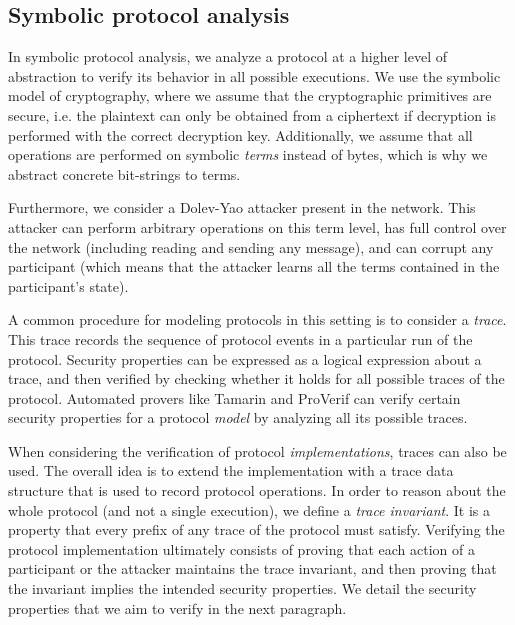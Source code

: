 
\subsection{Symbolic protocol analysis}
\label{sec:symbolic-protocol-analysis}

In symbolic protocol analysis, we analyze a protocol at a higher level of abstraction to verify its behavior in all possible executions.
We use the symbolic model of cryptography, where we assume that the cryptographic primitives are secure, i.e. the plaintext can only be obtained from a ciphertext if decryption is performed with the correct decryption key.
Additionally, we assume that all operations are performed on symbolic \emph{terms} instead of bytes, which is why we abstract concrete bit-strings to terms.

Furthermore, we consider a Dolev-Yao\cite{} attacker present in the network. This attacker can perform arbitrary operations on this term level, has full control over the network (including reading and sending any message), and can corrupt any participant (which means that the attacker learns all the terms contained in the participant's state).

A common procedure for modeling protocols in this setting is to consider a \emph{trace}. This trace records the sequence of protocol events in a particular run of the protocol.
Security properties can be expressed as a logical expression about a trace, and then verified by checking whether it holds for all possible traces of the protocol.
Automated provers like Tamarin and ProVerif can verify certain security properties for a protocol \emph{model} by analyzing all its possible traces.

When considering the verification of protocol \emph{implementations}, traces can also be used. The overall idea is to extend the implementation with a trace data structure that is used to record protocol operations. In order to reason about the whole protocol (and not a single execution), we define a \emph{trace invariant}. It is a property that every prefix of any trace of the protocol must satisfy.
Verifying the protocol implementation ultimately consists of proving that each action of a participant or the attacker maintains the trace invariant, and then proving that the invariant implies the intended security properties.
We detail the security properties that we aim to verify in the next paragraph.

